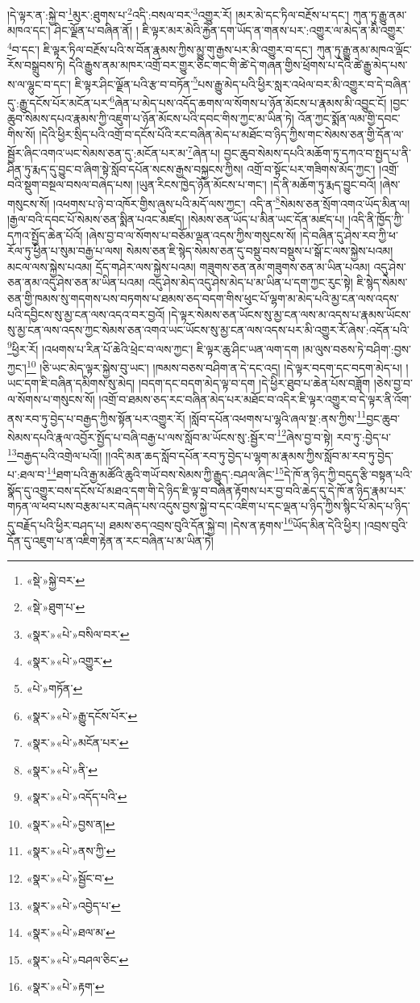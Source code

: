 །དེ་ལྟར་ན་:སྐྱེ་བ་\footnote{«སྡེ་»སྐྱེ་བར་}མུར་:ཐུགས་པ་\footnote{«སྡེ་»ཐུག་པ་}འདི་:བསལ་བར་\footnote{«སྣར་»«པེ་»བསིལ་བར་}འགྱུར་རོ། །མར་མེ་དང་ཏིལ་བརྔོས་པ་དང་། ཀུན་ཏུ་རྒྱུ་ནམ་མཁའ་དང་། ཤིང་ལྗོན་པ་བཞིན་ནོ། །
ཇི་ལྟར་མར་མེའི་རྐྱེན་དག་ཡོད་ན་གནས་པར་:འགྱུར་ལ་མེད་ན་མི་འགྱུར་\footnote{«སྣར་»«པེ་»འགྱུར་}བ་དང་། ཇི་ལྟར་ཏིལ་བརྔོས་པའི་ས་བོན་རྣམས་ཀྱིས་མྱུ་གུ་རྒྱས་པར་མི་འགྱུར་བ་དང་། ཀུན་ཏུ་རྒྱུ་ནམ་མཁའ་ལྡོང་རོས་བསྒྲུབས་ཏེ། དེའི་རྒྱུས་ནམ་མཁར་འགྲོ་བར་གྱུར་ཅིང་གང་གི་ཚེ་དེ་གཞན་གྱིས་ཕྲོགས་པ་དེའི་ཚེ་རྒྱུ་མེད་པས་ས་ལ་ལྷུང་བ་དང་། ཇི་ལྟར་ཤིང་ལྗོན་པའི་རྩ་བ་བཏོན་\footnote{«པེ་»གཏོན་}པས་རྒྱུ་མེད་པའི་ཕྱིར་སླར་འཕེལ་བར་མི་འགྱུར་བ་དེ་བཞིན་དུ་:རྒྱུ་དངོས་པོར་མངོན་པར་\footnote{«སྣར་»«པེ་»རྒྱུ་དངོས་པོར་}ཞེན་པ་མེད་པས་འདོད་ཆགས་ལ་སོགས་པ་ཉོན་མོངས་པ་རྣམས་མི་འབྱུང་ངོ། །བྱང་ཆུབ་སེམས་དཔའ་རྣམས་ཀྱི་འཇུག་པ་ཉོན་མོངས་པའི་དབང་གིས་ཀྱང་མ་ཡིན་ཏེ། འོན་ཀྱང་སྨོན་ལམ་གྱི་དབང་གིས་སོ། །དེའི་ཕྱིར་སྲིད་པའི་འགྲོ་བ་དངོས་པོའི་རང་བཞིན་མེད་པ་མཐོང་བ་ཉིད་ཀྱིས་གང་སེམས་ཅན་གྱི་དོན་ལ་སྦྱོར་ཞིང་འགའ་ཡང་སེམས་ཅན་དུ་:མངོན་པར་མ་\footnote{«སྣར་»«པེ་»མངོན་པར་}ཞེན་པ། བྱང་ཆུབ་སེམས་དཔའི་མཆོག་ཏུ་དཀའ་བ་སྤྱད་པ་ནི་ཤིན་ཏུ་རྨད་དུ་བྱུང་བ་ཞིག་སྟེ་སློབ་དཔོན་སངས་རྒྱས་བསྐྱངས་ཀྱིས། འགྲོ་བ་སྟོང་པར་གཟིགས་མོད་ཀྱང་། །འགྲོ་བའི་སྡུག་བསྔལ་བསལ་བཞེད་པས། །ཡུན་རིངས་ཁྱེད་ཉོན་མོངས་པ་གང་། །དེ་ནི་མཆོག་ཏུ་རྨད་བྱུང་བའོ། །ཞེས་གསུངས་སོ། །འཕགས་པ་ཉེ་བ་འཁོར་གྱིས་ཞུས་པའི་མདོ་ལས་ཀྱང་། འདི་ན་\footnote{«སྣར་»«པེ་»ནི་}སེམས་ཅན་སྲོག་འགའ་ཡོད་མིན་ལ། །རྒྱལ་བའི་དབང་པོ་སེམས་ཅན་སྨིན་པའང་མཛད། །སེམས་ཅན་ཡོད་པ་མིན་ཡང་དོན་མཛད་པ། །འདི་ནི་ཁྱོད་ཀྱི་དཀའ་སྤྱོད་ཆེན་པོའོ། །ཞེས་བྱ་བ་ལ་སོགས་པ་བཅོམ་ལྡན་འདས་ཀྱིས་གསུངས་སོ། །དེ་བཞིན་དུ་ཤེས་རབ་ཀྱི་ཕ་རོལ་ཏུ་ཕྱིན་པ་སུམ་བརྒྱ་པ་ལས། སེམས་ཅན་ཇི་སྙེད་སེམས་ཅན་དུ་བསྡུ་བས་བསྡུས་པ་སྒོ་ང་ལས་སྐྱེས་པའམ། མངལ་ལས་སྐྱེས་པའམ། དྲོད་གཤེར་ལས་སྐྱེས་པའམ། གཟུགས་ཅན་ནམ་གཟུགས་ཅན་མ་ཡིན་པའམ། འདུ་ཤེས་ཅན་ནམ་འདུ་ཤེས་ཅན་མ་ཡིན་པའམ། འདུ་ཤེས་མེད་འདུ་ཤེས་མེད་པ་མ་ཡིན་པ་དག་ཀྱང་རུང་སྟེ། ཇི་སྙེད་སེམས་ཅན་གྱི་ཁམས་སུ་གདགས་པས་བཏགས་པ་ཐམས་ཅད་བདག་གིས་ཕུང་པོ་ལྷག་མ་མེད་པའི་མྱ་ངན་ལས་འདས་པའི་དབྱིངས་སུ་མྱ་ངན་ལས་འདའ་བར་བྱའོ། །དེ་ལྟར་སེམས་ཅན་ཡོངས་སུ་མྱ་ངན་ལས་མ་འདས་པ་རྣམས་ཡོངས་སུ་མྱ་ངན་ལས་འདས་ཀྱང་སེམས་ཅན་འགའ་ཡང་ཡོངས་སུ་མྱ་ངན་ལས་འདས་པར་མི་འགྱུར་རོ་ཞེས་:འདོན་པའི་\footnote{«སྣར་»«པེ་»འདོད་པའི་}ཕྱིར་རོ། །འཕགས་པ་རིན་པོ་ཆེའི་ཕྲེང་བ་ལས་ཀྱང་། ཇི་ལྟར་ཆུ་ཤིང་ཡན་ལག་དག །མ་ལུས་བཅས་ཏེ་བཤིག་:བྱས་ཀྱང་།\footnote{«སྣར་»«པེ་»བྱས་ན།} །ཅི་ཡང་མེད་ལྟར་སྐྱེས་བུ་ཡང་། །ཁམས་བཅས་བཤིག་ན་དེ་དང་འདྲ། །དེ་ལྟར་བདག་དང་བདག་མེད་པ། །ཡང་དག་ཇི་བཞིན་དམིགས་སུ་མེད། །བདག་དང་བདག་མེད་ལྟ་བ་དག །དེ་ཕྱིར་ཐུབ་པ་ཆེན་པོས་བཟློག །ཅེས་བྱ་བ་ལ་སོགས་པ་གསུངས་སོ། །འགྲོ་བ་ཐམས་ཅད་རང་བཞིན་མེད་པར་མཐོང་བ་འདིར་ཇི་ལྟར་འགྱུར་བ་དེ་ལྟར་ནི་འོག་ནས་རབ་ཏུ་བྱེད་པ་བརྒྱད་ཀྱིས་སྟོན་པར་འགྱུར་རོ། །སློབ་དཔོན་འཕགས་པ་ལྷའི་ཞལ་སྔ་:ནས་ཀྱིས་\footnote{«སྣར་»«པེ་»ནས་ཀྱི་}བྱང་ཆུབ་སེམས་དཔའི་རྣལ་འབྱོར་སྤྱོད་པ་བཞི་བརྒྱ་པ་ལས་སློབ་མ་ཡོངས་སུ་:སྦྱོར་བ་\footnote{«སྣར་»«པེ་»སྦྱོང་བ་}ཞེས་བྱ་བ་སྟེ། རབ་ཏུ་:བྱེད་པ་\footnote{«སྣར་»«པེ་»འབྱེད་པ་}བརྒྱད་པའི་འགྲེལ་པའོ།། །།འདི་མན་ཆད་སློབ་དཔོན་རབ་ཏུ་བྱེད་པ་ལྷག་མ་རྣམས་ཀྱིས་སློབ་མ་རབ་ཏུ་བྱེད་པ་:ཐལ་བ་\footnote{«སྣར་»«པེ་»ཐལ་མ་}ཐག་པའི་རྒྱ་མཚོའི་ཆུའི་གཡོ་བས་སེམས་ཀྱི་རྒྱུད་:བཤལ་ཞིང་\footnote{«སྣར་»«པེ་»བཤལ་ཅིང་}དེ་ཁོ་ན་ཉིད་ཀྱི་བདུད་རྩི་བསྟན་པའི་སྣོད་དུ་འགྱུར་བས་དངོས་པོ་མཐའ་དག་གི་དེ་ཉིད་ཇི་ལྟ་བ་བཞིན་རྟོགས་པར་བྱ་བའི་ཆེད་དུ་དེ་ཁོ་ན་ཉིད་རྣམ་པར་གཏན་ལ་ཕབ་པས་བརྩམ་པར་བཞེད་པས་འདུས་བྱས་སྐྱེ་བ་དང་འཇིག་པ་དང་ལྡན་པ་ཉིད་ཀྱིས་སྙིང་པོ་མེད་པ་ཉིད་དུ་བརྗོད་པའི་ཕྱིར་བཤད་པ། ཐམས་ཅད་འབྲས་བུའི་དོན་སྐྱེ་བ། །དེས་ན་རྟགས་\footnote{«སྣར་»«པེ་»རྟག་}ཡོད་མིན་དེའི་ཕྱིར། །འབྲས་བུའི་དོན་དུ་འཇུག་པ་ན་འཇིག་རྟེན་ན་རང་བཞིན་པ་མ་ཡིན་ཏེ། 